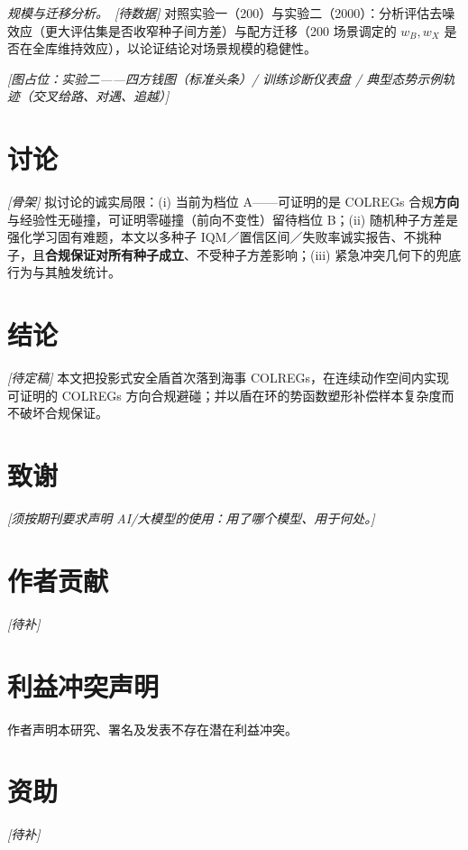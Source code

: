 \documentclass[12pt,letterpaper]{article}
\begin{document}
\textit{规模与迁移分析。}\ \textit{[待数据]} 对照实验一（200）与实验二（2000）：分析评估去噪效应（更大评估集是否收窄种子间方差）与配方迁移（200 场景调定的 $w_B,w_X$ 是否在全库维持效应），以论证结论对场景规模的稳健性。

\textit{[图占位：实验二——四方钱图（标准头条）/ 训练诊断仪表盘 / 典型态势示例轨迹（交叉给路、对遇、追越）]}

\section{讨论}
\textit{[骨架]} 拟讨论的诚实局限：(i) 当前为档位 A——可证明的是 COLREGs 合规\textbf{方向}与经验性无碰撞，可证明零碰撞（前向不变性）留待档位 B；(ii) 随机种子方差是强化学习固有难题，本文以多种子 IQM／置信区间／失败率诚实报告、不挑种子，且\textbf{合规保证对所有种子成立}、不受种子方差影响；(iii) 紧急冲突几何下的兜底行为与其触发统计。

\section{结论}
\textit{[待定稿]} 本文把投影式安全盾首次落到海事 COLREGs，在连续动作空间内实现可证明的 COLREGs 方向合规避碰；并以盾在环的势函数塑形补偿样本复杂度而不破坏合规保证。

\section{致谢}
\textit{[须按期刊要求声明 AI/大模型的使用：用了哪个模型、用于何处。]}

\section{作者贡献}
\textit{[待补]}

\section{利益冲突声明}
作者声明本研究、署名及发表不存在潜在利益冲突。

\section{资助}
\textit{[待补]}

\end{document}

